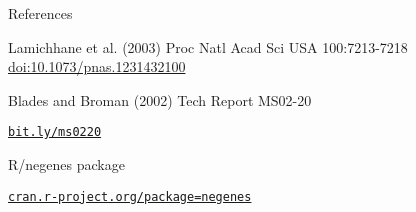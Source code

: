 \documentclass[aspectratio=169,12pt,t]{beamer}
\begin{document}
\begin{frame}{References}

  \bbi
\item Lamichhane et al. (2003) Proc Natl Acad Sci USA 100:7213-7218
    \href{https://doi.org/10.1073/pnas.1231432100}{doi:10.1073/pnas.1231432100}

  \item Blades and Broman (2002) Tech Report MS02-20

\href{https://www.biostat.wisc.edu/~kbroman/publications/ms0220.pdf}{\tt bit.ly/ms0220}

\item R/negenes package

  \href{https://cran.r-project.org/package=negenes}{\tt cran.r-project.org/package=negenes}


    \ei

    \note{
      }
\end{frame}
\end{document}
